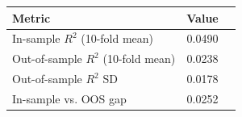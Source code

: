 \begin{tabular}{lcc}\toprule Metric & Value \\ \midrule In-sample $R^2$ (10-fold mean) & 0.0490 \\ Out-of-sample $R^2$ (10-fold mean) & 0.0238 \\ Out-of-sample $R^2$ SD & 0.0178 \\ In-sample vs. OOS gap & 0.0252 \\ \bottomrule \end{tabular}